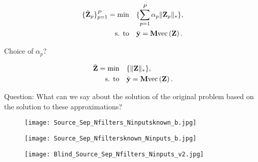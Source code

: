 \documentclass{article}
\def\Z{{\mathbf Z}}
\def\M{{\mathbf M}}
\def\y{{\mathbf y}}
\begin{document}
\begin{align}
\label{eq:bss_convex_minimization2}
   \{\hbZ_p\}_{p=1}^{P} =\text{min} \quad &\{\sum_{p=1}^P \alpha_p \|\Z_p\|_{*}\}, \\
  \text{s. to} \quad & \bar{\y} = \M \text{vec}\left(\Z\right). \nonumber
\end{align}

\noindent
Choice of $\alpha_p$?

\begin{align}
\label{eq:bss_convex_minimization1}
   \hbZ =\text{min} \quad &\{\|\Z\|_{*}\}, \\
  \text{s. to} \quad & \bar{\y} = \M \text{vec}\left(\Z\right). \nonumber
\end{align}

\noindent
Question: What can we say about the solution of the original problem based on the solution to these approximations?

\begin{figure}
  \centering
  \texttt{[image: Source\_Sep\_Nfilters\_Ninputsknown\_b.jpg]}
\end{figure}

\begin{figure}
  \centering
  \texttt{[image: Source\_Sep\_Nfiltersknown\_Ninputs\_b.jpg]}
\end{figure}

\begin{figure}
  \centering
  \texttt{[image: Blind\_Source\_Sep\_Nfilters\_Ninputs\_v2.jpg]}
\end{figure}
\end{document}
